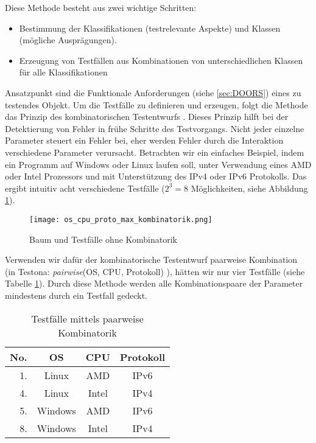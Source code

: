  Diese Methode besteht aus zwei wichtige Schritten:
\begin{itemize}
\item Bestimmung der Klassifikationen (testrelevante Aspekte) und Klassen (mögliche Ausprägungen).
\item Erzeugung von Testfällen aus Kombinationen von unterschiedlichen Klassen für alle Klassifikationen
\end{itemize}

Ansatzpunkt sind die Funktionale Anforderungen (siehe \ref{sec:DOORS}) eines zu testendes Objekt. Um die Testfälle zu definieren und erzeugen, folgt die Methode das Prinzip des kombinatorischen Testentwurfs \cite{KlassifikationsbaumMethode}. Dieses Prinzip hilft bei der Detektierung von Fehler in frühe Schritte des Testvorgangs. Nicht jeder einzelne Parameter steuert ein Fehler bei, eher werden Fehler durch die Interaktion verschiedene Parameter verursacht. Betrachten wir ein einfaches Beispiel, indem ein Programm auf Windows oder Linux laufen soll, unter Verwendung eines AMD oder Intel Prozessors und mit Unterstützung des IPv4 oder IPv6 Protokolls. Das ergibt intuitiv acht verschiedene Testfälle ($2^{3} = 8$ Möglichkeiten, siehe Abbildung \ref{ttn.no_kombi}).\\

\begin{figure}[h]
  \begin{center}
    \texttt{[image: os\_cpu\_proto\_max\_kombinatorik.png]}
  		  \caption{Baum und Testfälle ohne Kombinatorik}
     \label{ttn.no_kombi}
  \end{center}
\end{figure}


Verwenden wir dafür der kombinatorische Testentwurf \glqq paarweise Kombination\grqq~ (in Testona: \textit{pairwise}(OS, CPU, Protokoll) ), hätten wir nur vier Testfälle (siehe Tabelle \ref{table:4TestCases}). Durch diese Methode werden alle Kombinationspaare der Parameter mindestens durch ein Testfall gedeckt\cite{CombinatorialSoftTesting}.\\

\begin{table}[h]


\begin{center}
	\begin{tabular}{|r||c|c|c|}
	 \hline
	 No. &OS &CPU &Protokoll\\
	 \hline
	 1. &Linux &AMD &IPv6\\
	 \hline
	 4. &Linux &Intel &IPv4\\
	 \hline
	 5. &Windows &AMD &IPv6\\
	 \hline
	 8. &Windows &Intel &IPv4\\
	 \hline
	\end{tabular}
	
	\caption{Testfälle mittels paarweise Kombinatorik}
	\label{table:4TestCases}
\end{center}

\end{table}



